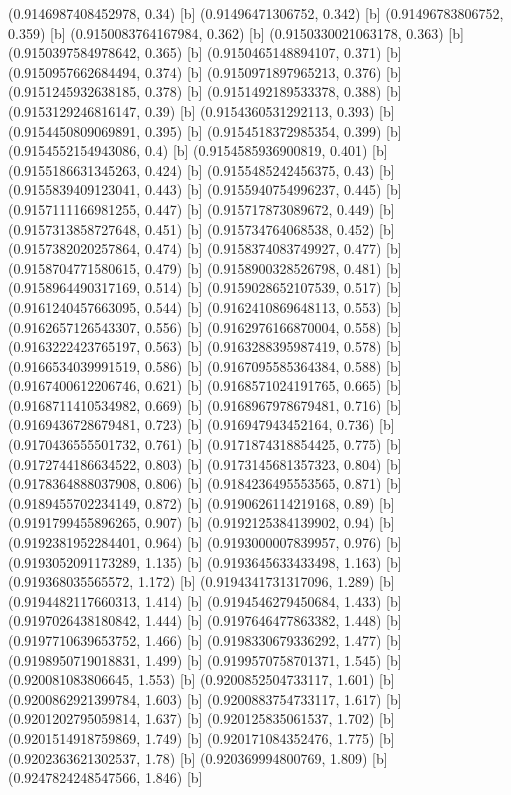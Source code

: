 {{{(0.9146987408452978, 0.34) [b] 
(0.91496471306752, 0.342) [b] 
(0.91496783806752, 0.359) [b] 
(0.9150083764167984, 0.362) [b] 
(0.9150330021063178, 0.363) [b] 
(0.9150397584978642, 0.365) [b] 
(0.9150465148894107, 0.371) [b] 
(0.9150957662684494, 0.374) [b] 
(0.9150971897965213, 0.376) [b] 
(0.9151245932638185, 0.378) [b] 
(0.9151492189533378, 0.388) [b] 
(0.9153129246816147, 0.39) [b] 
(0.9154360531292113, 0.393) [b] 
(0.9154450809069891, 0.395) [b] 
(0.9154518372985354, 0.399) [b] 
(0.9154552154943086, 0.4) [b] 
(0.9154585936900819, 0.401) [b] 
(0.9155186631345263, 0.424) [b] 
(0.9155485242456375, 0.43) [b] 
(0.9155839409123041, 0.443) [b] 
(0.9155940754996237, 0.445) [b] 
(0.9157111166981255, 0.447) [b] 
(0.915717873089672, 0.449) [b] 
(0.9157313858727648, 0.451) [b] 
(0.915734764068538, 0.452) [b] 
(0.9157382020257864, 0.474) [b] 
(0.9158374083749927, 0.477) [b] 
(0.9158704771580615, 0.479) [b] 
(0.9158900328526798, 0.481) [b] 
(0.9158964490317169, 0.514) [b] 
(0.9159028652107539, 0.517) [b] 
(0.9161240457663095, 0.544) [b] 
(0.9162410869648113, 0.553) [b] 
(0.9162657126543307, 0.556) [b] 
(0.9162976166870004, 0.558) [b] 
(0.9163222423765197, 0.563) [b] 
(0.9163288395987419, 0.578) [b] 
(0.9166534039991519, 0.586) [b] 
(0.9167095585364384, 0.588) [b] 
(0.9167400612206746, 0.621) [b] 
(0.9168571024191765, 0.665) [b] 
(0.9168711410534982, 0.669) [b] 
(0.9168967978679481, 0.716) [b] 
(0.9169436728679481, 0.723) [b] 
(0.916947943452164, 0.736) [b] 
(0.9170436555501732, 0.761) [b] 
(0.9171874318854425, 0.775) [b] 
(0.9172744186634522, 0.803) [b] 
(0.9173145681357323, 0.804) [b] 
(0.9178364888037908, 0.806) [b] 
(0.9184236495553565, 0.871) [b] 
(0.9189455702234149, 0.872) [b] 
(0.9190626114219168, 0.89) [b] 
(0.9191799455896265, 0.907) [b] 
(0.9192125384139902, 0.94) [b] 
(0.9192381952284401, 0.964) [b] 
(0.9193000007839957, 0.976) [b] 
(0.9193052091173289, 1.135) [b] 
(0.9193645633433498, 1.163) [b] 
(0.919368035565572, 1.172) [b] 
(0.9194341731317096, 1.289) [b] 
(0.9194482117660313, 1.414) [b] 
(0.9194546279450684, 1.433) [b] 
(0.9197026438180842, 1.444) [b] 
(0.9197646477863382, 1.448) [b] 
(0.9197710639653752, 1.466) [b] 
(0.9198330679336292, 1.477) [b] 
(0.9198950719018831, 1.499) [b] 
(0.9199570758701371, 1.545) [b] 
(0.920081083806645, 1.553) [b] 
(0.9200852504733117, 1.601) [b] 
(0.9200862921399784, 1.603) [b] 
(0.9200883754733117, 1.617) [b] 
(0.9201202795059814, 1.637) [b] 
(0.920125835061537, 1.702) [b] 
(0.9201514918759869, 1.749) [b] 
(0.920171084352476, 1.775) [b] 
(0.9202363621302537, 1.78) [b] 
(0.920369994800769, 1.809) [b] 
(0.9247824248547566, 1.846) [b] 
}}}
